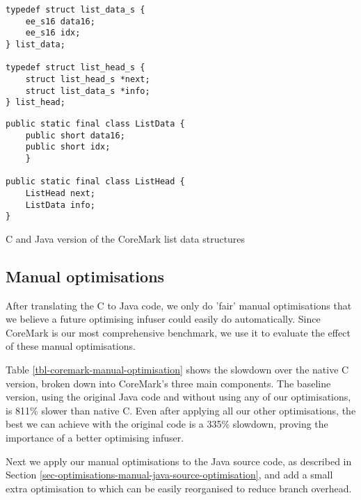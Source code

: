 \begin{listing}[H]
 \centering
 \begin{minipage}[t]{0.45\textwidth}
  \centering
  \begin{verbatim}
typedef struct list_data_s {
    ee_s16 data16;
    ee_s16 idx;
} list_data;

typedef struct list_head_s {
    struct list_head_s *next;
    struct list_data_s *info;
} list_head;
  \end{verbatim}
 \end{minipage}\hfill
 \begin{minipage}[t]{0.45\textwidth}
  \centering
  \begin{verbatim}
public static final class ListData {
    public short data16;
    public short idx;
    }

public static final class ListHead {
    ListHead next;
    ListData info;
}
  \end{verbatim}
 \end{minipage}
\caption{C and Java version of the CoreMark list data structures}
\label{lst-coremark-list-data-structures}
\end{listing}

\subsection{Manual optimisations}
\label{sec-evaluation-manual-optimisations}
After translating the C to Java code, we only do 'fair' manual optimisations that we believe a future optimising infuser could easily do automatically. Since CoreMark is our most comprehensive benchmark, we use it to evaluate the effect of these manual optimisations.



Table \ref{tbl-coremark-manual-optimisation} shows the slowdown over the native C version, broken down into CoreMark's three main components. The baseline version, using the original Java code and without using any of our optimisations, is 811\% slower than native C. Even after applying all our other optimisations, the best we can achieve with the original code is a 335\% slowdown, proving the importance of a better optimising infuser.

Next we apply our manual optimisations to the Java source code, as described in Section \ref{sec-optimisations-manual-java-source-optimisation}, and add a small extra optimisation to  which can be easily reorganised to reduce branch overhead.

